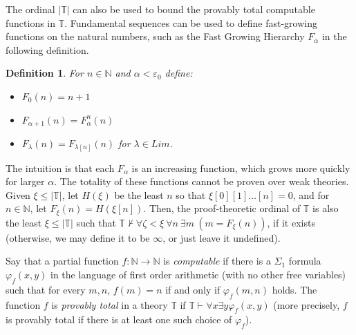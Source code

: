 \documentclass{amsart}
\theoremstyle{plain}
\theoremstyle{plain}
\newtheorem*{definition}{Definition}
\newcommand{\al}{{\alpha}}
\newcommand{\la}{\lambda}
\newcommand\Nat{\mathbb{N}}
\begin{document}
The ordinal $|\mathbb{T}|$ can also be used to bound the provably total computable functions in $\mathbb{T}$.
Fundamental sequences can be used to define fast-growing functions on
the natural numbers, such as the Fast Growing Hierarchy $F_\al$ in the following definition.
\begin{definition}
    For $n\in \Nat$ and $\al<\varepsilon_0$ define:
    \begin{itemize}
        \item $F_0(n)=n+1$
        \item $F_{\al+1}(n) = F^n_\al(n)$
        \item $F_\la(n) = F_{\la[n]}(n)$ for $\la\in Lim$.
    \end{itemize}
\end{definition}
The intuition is that each $F_\al$ is an increasing function, which grows
more quickly for larger $\al$.
The totality of these functions cannot be proven over weak theories.
\\


Given $\xi\leq |\mathbb{T}| $, let $H(\xi)$ be the least $n$ so that $\xi[0][1]\ldots [n] =0$, and for $n\in\mathbb N$, let $F_\xi(n) = H ( \xi [n])$.
Then, the proof-theoretic ordinal of $\mathbb{T}$ is also the least $\xi\leq |\mathbb{T}|$ such that $\mathbb{T} \not\vdash \forall \zeta<\xi \ \forall n \  \exists m \ ( m = F_\xi(n) )$, if it exists (otherwise, we may define it to be $\infty$, or just leave it undefined).

Say that a partial function $f\colon \mathbb N \to \mathbb N$ is {\em computable} if there is a $\Sigma_1$ formula $\varphi_f (x,y)$ in the language of first order arithmetic (with no other free variables) such that for every $m,n$, $f(m) = n$ if and only if $\varphi_f (m,n)$ holds.
The function $f$ is {\em provably total} in a theory $\mathbb{T}$ if $\mathbb{T}\vdash \forall x \exists y \varphi _f (x,y) $ (more precisely, $f$ is provably total if there is at least one such choice of $ \varphi _f $).
\end{document}
